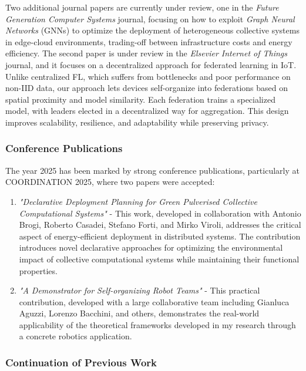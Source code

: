 \documentclass[runningheads]{llncs}
\begin{document}
Two additional journal papers are currently under review,
one in the \emph{Future Generation Computer Systems} journal,
focusing on how to exploit \emph{Graph Neural Networks} (GNNs) to optimize the deployment of heterogeneous collective systems in edge-cloud environments,
trading-off between infrastructure costs and energy efficiency.
%
The second paper is under review in the \emph{Elsevier Internet of Things} journal,
and it focuses on a decentralized approach for federated learning in IoT.
%
Unlike centralized FL,
which suffers from bottlenecks and poor performance on non-IID data,
our approach lets devices self-organize into federations based on spatial proximity and model similarity.
%
Each federation trains a specialized model,
with leaders elected in a decentralized way for aggregation.
%
This design improves scalability, resilience, and adaptability while preserving privacy.

\subsubsection{Conference Publications}

The year 2025 has been marked by strong conference publications, particularly at COORDINATION 2025, where two papers were accepted:

\begin{enumerate}
\item \textit{"Declarative Deployment Planning for Green Pulverised Collective Computational Systems"} - This work, developed in collaboration with Antonio Brogi, Roberto Casadei, Stefano Forti, and Mirko Viroli, addresses the critical aspect of energy-efficient deployment in distributed systems. The contribution introduces novel declarative approaches for optimizing the environmental impact of collective computational systems while maintaining their functional properties.

\item \textit{"A Demonstrator for Self-organizing Robot Teams"} - This practical contribution, developed with a large collaborative team including Gianluca Aguzzi, Lorenzo Bacchini, and others, demonstrates the real-world applicability of the theoretical frameworks developed in my research through a concrete robotics application.
\end{enumerate}

\subsubsection{Continuation of Previous Work}
\end{document}
